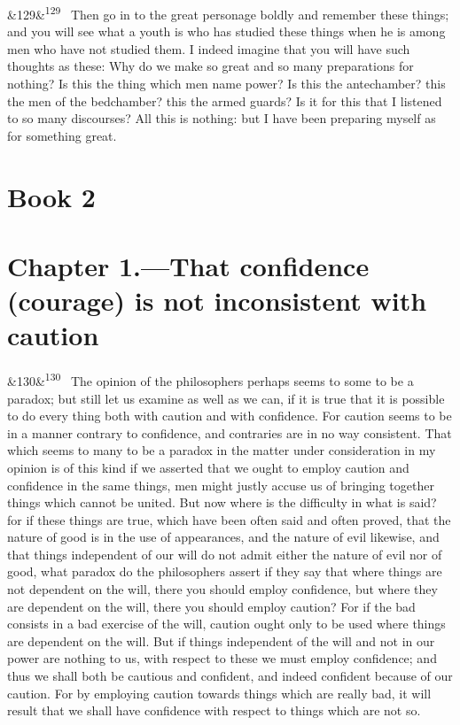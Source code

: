 \documentclass[12pt]{article}
\newcommand{\para}[1][]{\par\noindent\ifx&#1&\else\textsuperscript{\footnotesize #1}~\fi}
\begin{document}
\para[129] Then go in to the great personage boldly and remember these things; and you will see what a youth is who has studied these things when he is among men who have not studied them. I indeed imagine that you will have such thoughts as these: Why do we make so great and so many preparations for nothing? Is this the thing which men name power? Is this the antechamber? this the men of the bedchamber? this the armed guards? Is it for this that I listened to so many discourses? All this is nothing: but I have been preparing myself as for something great.

\section*{Book 2}

\section*{Chapter 1.---That confidence (courage) is not inconsistent with caution}

\para[130] The opinion of the philosophers perhaps seems to some to be a paradox; but still let us examine as well as we can, if it is true that it is possible to do every thing both with caution and with confidence. For caution seems to be in a manner contrary to confidence, and contraries are in no way consistent. That which seems to many to be a paradox in the matter under consideration in my opinion is of this kind if we asserted that we ought to employ caution and confidence in the same things, men might justly accuse us of bringing together things which cannot be united. But now where is the difficulty in what is said? for if these things are true, which have been often said and often proved, that the nature of good is in the use of appearances, and the nature of evil likewise, and that things independent of our will do not admit either the nature of evil nor of good, what paradox do the philosophers assert if they say that where things are not dependent on the will, there you should employ confidence, but where they are dependent on the will, there you should employ caution? For if the bad consists in a bad exercise of the will, caution ought only to be used where things are dependent on the will. But if things independent of the will and not in our power are nothing to us, with respect to these we must employ confidence; and thus we shall both be cautious and confident, and indeed confident because of our caution. For by employing caution towards things which are really bad, it will result that we shall have confidence with respect to things which are not so.
\end{document}
